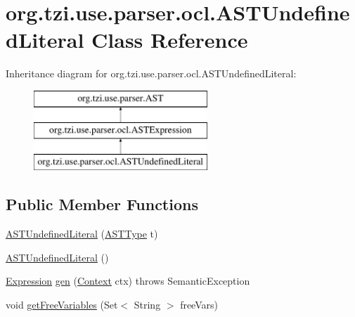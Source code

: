 \hypertarget{classorg_1_1tzi_1_1use_1_1parser_1_1ocl_1_1_a_s_t_undefined_literal}{\section{org.\-tzi.\-use.\-parser.\-ocl.\-A\-S\-T\-Undefined\-Literal Class Reference}
\label{classorg_1_1tzi_1_1use_1_1parser_1_1ocl_1_1_a_s_t_undefined_literal}
}
Inheritance diagram for org.\-tzi.\-use.\-parser.\-ocl.\-A\-S\-T\-Undefined\-Literal\-:\begin{figure}[H]
\begin{center}
\leavevmode
\includegraphics[height=3.000000cm]{classorg_1_1tzi_1_1use_1_1parser_1_1ocl_1_1_a_s_t_undefined_literal}
\end{center}
\end{figure}
\subsection*{Public Member Functions}
\begin{DoxyCompactItemize}
\item 
\hyperlink{classorg_1_1tzi_1_1use_1_1parser_1_1ocl_1_1_a_s_t_undefined_literal_a6171e41de2f76d62552c96f0e919a952}{A\-S\-T\-Undefined\-Literal} (\hyperlink{classorg_1_1tzi_1_1use_1_1parser_1_1ocl_1_1_a_s_t_type}{A\-S\-T\-Type} t)
\item 
\hyperlink{classorg_1_1tzi_1_1use_1_1parser_1_1ocl_1_1_a_s_t_undefined_literal_a50c46dbc1ff2b660185adc6df5b8b911}{A\-S\-T\-Undefined\-Literal} ()
\item 
\hyperlink{classorg_1_1tzi_1_1use_1_1uml_1_1ocl_1_1expr_1_1_expression}{Expression} \hyperlink{classorg_1_1tzi_1_1use_1_1parser_1_1ocl_1_1_a_s_t_undefined_literal_ad0aa5e7aae2e00bd0cc71a18792d251c}{gen} (\hyperlink{classorg_1_1tzi_1_1use_1_1parser_1_1_context}{Context} ctx)  throws Semantic\-Exception 
\item 
void \hyperlink{classorg_1_1tzi_1_1use_1_1parser_1_1ocl_1_1_a_s_t_undefined_literal_a16bca94b5394b9c905f7d53eaa544573}{get\-Free\-Variables} (Set$<$ String $>$ free\-Vars)
\end{DoxyCompactItemize}
